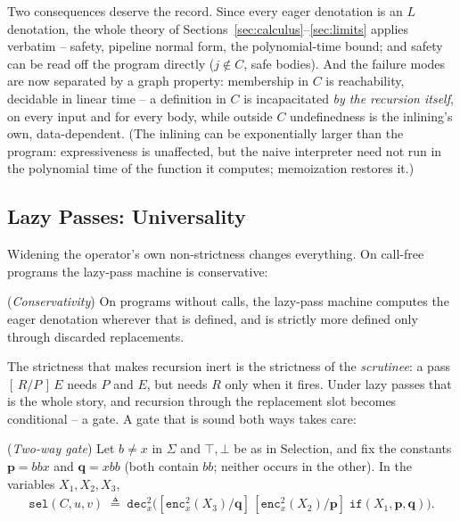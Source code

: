 \documentclass[runningheads,envcountsect]{llncs}
\begin{document}
Two consequences deserve the record. Since every eager denotation is an $L$ denotation, the whole theory of Sections~\ref{sec:calculus}--\ref{sec:limits} applies verbatim -- safety, pipeline normal form, the polynomial-time bound; and safety can be read off the program directly ($j \notin C$, safe bodies). And the failure modes are now separated by a graph property: membership in $C$ is reachability, decidable in linear time -- a definition in $C$ is incapacitated \emph{by the recursion itself}, on every input and for every body, while outside $C$ undefinedness is the inlining's own, data-dependent. (The inlining can be exponentially larger than the program: expressiveness is unaffected, but the naive interpreter need not run in the polynomial time of the function it computes; memoization restores it.)

\subsection{Lazy Passes: Universality}
\label{sec:rec-lazy}

Widening the operator's own non-strictness changes everything. On call-free programs the lazy-pass machine is conservative:

\begin{proposition}
    (\emph{Conservativity})
    \label{prop:lpcons}
    On programs without calls, the lazy-pass machine computes the eager denotation wherever that is defined, and is strictly more defined only through discarded replacements.
\end{proposition}

The strictness that makes recursion inert is the strictness of the \emph{scrutinee}: a pass $[\,R/P\,]\,E$ needs $P$ and $E$, but needs $R$ only when it fires. Under lazy passes that is the whole story, and recursion through the replacement slot becomes conditional -- a gate. A gate that is sound both ways takes care:

\begin{definition}
    (\emph{Two-way gate})
    \label{def:gate}
    Let $b \neq x$ in $\Sigma$ and $\top, \bot$ be as in Selection, and fix the constants $\mathbf{p} = bbx$ and $\mathbf{q} = xbb$ (both contain $bb$; neither occurs in the other). In the variables $X_1, X_2, X_3$,
    \begin{align}
        \mathtt{sel}(C, u, v) \;\triangleq\; \mathtt{dec}^2_{x}\big([\mathtt{enc}^2_{x}(X_3)/\mathbf{q}]\,[\mathtt{enc}^2_{x}(X_2)/\mathbf{p}]\;\mathtt{if}(X_1, \mathbf{p}, \mathbf{q})\big).
    \end{align}
\end{definition}
\end{document}
